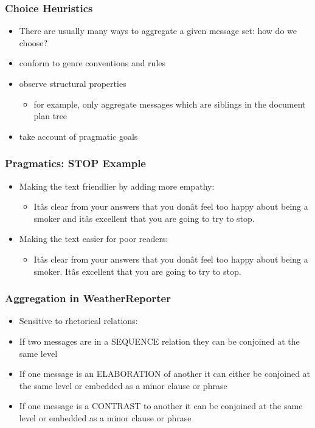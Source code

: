 \documentclass[compress,color=usenames]{beamer}
\begin{document}
\begin{frame}
\frametitle{Choice Heuristics}

\label{f210}
\begin{itemize}
\item { {There are usually many ways to aggregate a given message set: how do we choose?}}
\item { {conform to genre conventions and rules}}
\item { {observe structural properties}}
\begin{itemize}
\item for example, only aggregate messages which are siblings in the document plan tree
\end{itemize}
\item { {take account of pragmatic goals}}
\end{itemize}
 
\end{frame}

\begin{frame}
\frametitle{Pragmatics: STOP Example}

\label{f212}
\begin{itemize}
\item { {Making the text friendlier by adding more empathy:}}
\begin{itemize}
\item It\^as clear from your answers that you don\^at feel too happy about being a smoker and it\^as excellent that you are going to try to stop.
\end{itemize}
\item { {Making the text easier for poor readers:}}
\begin{itemize}
\item It\^as clear from your answers that you don\^at feel too happy about being a smoker. It\^as excellent that you are going to try to stop.
\end{itemize}
\end{itemize}
 
\end{frame}

\begin{frame}
\frametitle{Aggregation in WeatherReporter}

\label{f214}
\begin{itemize}
\item { {Sensitive to rhetorical relations:}}
\item { {If two messages are in a SEQUENCE relation they can be conjoined at the same level}}
\item { {If one message is an ELABORATION of another it can either be conjoined at the same level or embedded as a minor clause or phrase}}
\item { {If one message is a CONTRAST to another it can be conjoined at the same level or embedded as a minor clause or phrase}}
\end{itemize}
 \end{frame}
\end{document}
